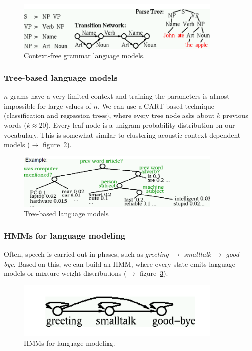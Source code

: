 \begin{figure}[htb]
\centering
\includegraphics[width=10cm]{images/cfglm.png}
\caption{\label{fig:contextFreeGrammarLM} Context-free grammar language models.}
\end{figure}

\subsubsection{Tree-based language models}
$n$-grams have a very limited context and training the parameters is almost impossible for large values of $n$. We can use a CART-based technique (classification and regression trees), where every tree node asks about $k$ previous words ($k \approx 20$). Every leaf node is a unigram probability distribution on our vocabulary. This is somewhat similar to clustering acoustic context-dependent models ($\to$ figure~\ref{fig:treeBasedLM}).

\begin{figure}[htb]
\centering
\includegraphics[width=10cm]{images/tblm.png}
\caption{\label{fig:treeBasedLM} Tree-based language models.}
\end{figure}

\subsubsection{HMMs for language modeling}

Often, speech is carried out in phases, such as \textit{greeting} $\rightarrow$ \textit{smalltalk} $\rightarrow$ \textit{good-bye}. Based on this, we can build an HMM, where every state emits language models or mixture weight distributions ($\to$ figure~\ref{fig:hmmLM}).

\begin{figure}[htb]
\centering
\includegraphics[width=10cm]{images/hmmlm.png}
\caption{\label{fig:hmmLM} HMMs for language modeling.}
\end{figure}


